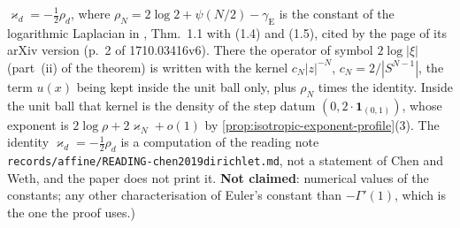 \begin{lemma}
{$\varkappa_d = -\tfrac12\rho_d$, where
$\rho_N = 2\log 2 + \psi(N/2) - \gamma_{\mathrm E}$ is the constant of the logarithmic Laplacian
in , Thm.~1.1 with (1.4) and (1.5), cited by the page of its arXiv
version (p.~2 of 1710.03416v6). There the operator of symbol $2\log|\xi|$
(part~(ii) of the theorem) is written with the kernel $c_N|z|^{-N}$, $c_N = 2/|S^{N-1}|$, the
term $u(x)$ being kept inside the unit ball only, plus $\rho_N$ times the identity. Inside the
unit ball that kernel is the \Levy{} density of the step datum $(0, 2\cdot\mathbf 1_{(0,1)})$,
whose exponent is $2\log\rho + 2\varkappa_N + o(1)$ by
\ref{prop:isotropic-exponent-profile}(3). The identity $\varkappa_d = -\tfrac12\rho_d$ is a computation of the
reading note \texttt{records/affine/READING-chen2019dirichlet.md}, not a statement of Chen and
Weth, and the paper does not print it. \textbf{Not claimed}: numerical values of the
constants; any
other characterisation of Euler's constant than $-\Gamma'(1)$, which is the one the proof
uses.)}
\end{lemma}


